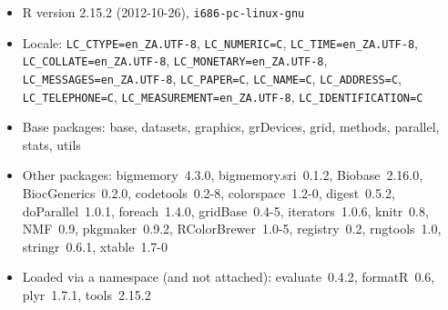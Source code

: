 \documentclass[a4paper]{article}\usepackage{graphicx, color}
\begin{document}
\begin{itemize}\raggedright
  \item R version 2.15.2 (2012-10-26), \verb|i686-pc-linux-gnu|
  \item Locale: \verb|LC_CTYPE=en_ZA.UTF-8|, \verb|LC_NUMERIC=C|, \verb|LC_TIME=en_ZA.UTF-8|, \verb|LC_COLLATE=en_ZA.UTF-8|, \verb|LC_MONETARY=en_ZA.UTF-8|, \verb|LC_MESSAGES=en_ZA.UTF-8|, \verb|LC_PAPER=C|, \verb|LC_NAME=C|, \verb|LC_ADDRESS=C|, \verb|LC_TELEPHONE=C|, \verb|LC_MEASUREMENT=en_ZA.UTF-8|, \verb|LC_IDENTIFICATION=C|
  \item Base packages: base, datasets, graphics,
    grDevices, grid, methods, parallel, stats, utils
  \item Other packages: bigmemory~4.3.0,
    bigmemory.sri~0.1.2, Biobase~2.16.0,
    BiocGenerics~0.2.0, codetools~0.2-8,
    colorspace~1.2-0, digest~0.5.2, doParallel~1.0.1,
    foreach~1.4.0, gridBase~0.4-5, iterators~1.0.6,
    knitr~0.8, NMF~0.9, pkgmaker~0.9.2,
    RColorBrewer~1.0-5, registry~0.2, rngtools~1.0,
    stringr~0.6.1, xtable~1.7-0
  \item Loaded via a namespace (and not attached):
    evaluate~0.4.2, formatR~0.6, plyr~1.7.1,
    tools~2.15.2
\end{itemize}




\printbibliography[heading=bibintoc]
\end{document}
